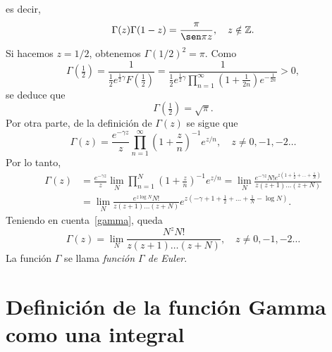 \documentclass[11pt]{book}
\theoremstyle{plain} %
\theoremstyle{definition} %
\newcommand\Z{\mathbb{Z}}
\begin{document}
es decir,
\[
   \Gamma(z) \Gamma(1-z) = \frac{\pi}{\sen \pi z},
   \quad z \notin \Z.
\]
Si hacemos $z = 1/2$, obtenemos $\Gamma(1/2)^2 = \pi$. Como
\[
   \Gamma(\tfrac{1}{2}) 
   = \frac{1}{\frac{1}{2} e^{\frac{1}{2}\gamma} F(\frac{1}{2})}
   = \frac{1}{\frac{1}{2} e^{\frac{1}{2}\gamma} 
   \prod_{n=1}^\infty (1 + \frac{1}{2n}) e^{-\frac{1}{2n}}}
   > 0,
\]
se deduce que
\[
   \Gamma(\tfrac{1}{2}) = \sqrt{\pi}.
\]
Por otra parte, de la definición de $\Gamma(z)$ se sigue que
\[
   \Gamma(z) = \frac{e^{-\gamma z}}{z} 
   \prod_{n=1}^\infty \left(1 + \frac{z}{n}\right)^{-1} e^{z/n},
   \quad z \not= 0, -1, -2 \dots
\]
Por lo tanto,
\begin{align*}
   \Gamma(z) &= \frac{e^{-\gamma z}}{z} 
   \lim_N \prod_{n=1}^N \left(1 + \frac{z}{n}\right)^{-1} e^{z/n}
   = \lim_N \frac{e^{-\gamma z} N! e^{z(1+\frac{1}{2}+\dots+\frac{1}{N})}}
   {z (z+1) \dots (z+N)}
   \\
   &= \lim_N \frac{e^{z \log N} N!}{z (z+1) \dots (z+N)}
   e^{z(-\gamma+1+\frac{1}{2}+\dots+\frac{1}{N}-\log N)}.
\end{align*}
Teniendo en cuenta~\eqref{gamma}, queda
\[
   \Gamma(z) = \lim_N \frac{N^z N!}{z (z+1) \dots (z+N)},
   \quad z \not= 0, -1, -2 \dots
\]
La función $\Gamma$ se llama \emph{función $\Gamma$ de Euler}.

\section{Definición de la función Gamma como una integral}
\label{Gamma-integral}
\end{document}
